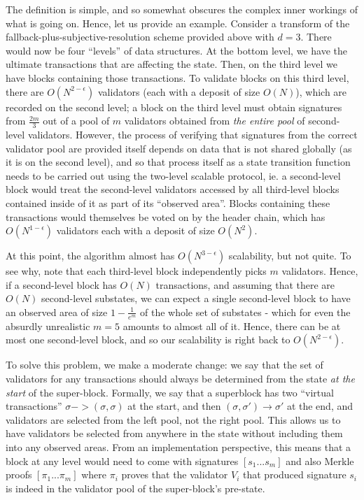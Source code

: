 \documentclass[11pt,a4paper]{report}
\theoremstyle{plain}
\theoremstyle{definition}
\theoremstyle{remark}
\begin{document}
The definition is simple, and so somewhat obscures the complex inner workings of what is going on. Hence, let us provide an example. Consider a transform of the fallback-plus-subjective-resolution scheme provided above with $d = 3$. There would now be four ``levels'' of data structures. At the bottom level, we have the ultimate transactions that are affecting the state. Then, on the third level we have blocks containing those transactions. To validate blocks on this third level, there are $O(N^{2-\epsilon})$ validators (each with a deposit of size $O(N)$), which are recorded on the second level; a block on the third level must obtain signatures from $\frac{2m}{3}$ out of a pool of $m$ validators obtained from \emph{the entire pool} of second-level validators. However, the process of verifying that signatures from the correct validator pool are provided itself depends on data that is not shared globally (as it is on the second level), and so that process itself as a state transition function needs to be carried out using the two-level scalable protocol, ie. a second-level block would treat the second-level validators accessed by all third-level blocks contained inside of it as part of its ``observed area''. Blocks containing these transactions would themselves be voted on by the header chain, which has $O(N^{1-\epsilon})$ validators each with a deposit of size $O(N^2)$.

At this point, the algorithm almost has $O(N^{3-\epsilon})$ scalability, but not quite. To see why, note that each third-level block independently picks $m$ validators. Hence, if a second-level block has $O(N)$ transactions, and assuming that there are $O(N)$ second-level substates, we can expect a single second-level block to have an observed area of size $1 - \frac{1}{e^m}$ of the whole set of substates - which for even the absurdly unrealistic $m = 5$ amounts to almost all of it. Hence, there can be at most one second-level block, and so our scalability is right back to $O(N^{2-\epsilon})$.

To solve this problem, we make a moderate change: we say that the set of validators for any transactions should always be determined from the state \emph{at the start} of the super-block. Formally, we say that a superblock has two ``virtual transactions'' $\sigma -> (\sigma, \sigma)$ at the start, and then $(\sigma, \sigma') \rightarrow \sigma'$ at the end, and validators are selected from the left pool, not the right pool. This allows us to have validators be selected from anywhere in the state without including them into any observed areas. From an implementation perspective, this means that a block at any level would need to come with signatures $[s_1 ... s_m]$ and also Merkle proofs $[\pi_1 ... \pi_m]$ where $\pi_i$ proves that the validator $V_i$ that produced signature $s_i$ is indeed in the validator pool of the super-block's pre-state.
\end{document}
